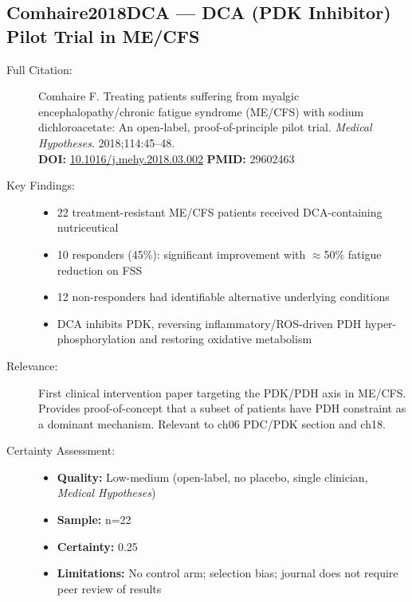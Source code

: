 \subsection*{Comhaire2018DCA --- DCA (PDK Inhibitor) Pilot Trial in ME/CFS}
\begin{description}
    \item[Full Citation:] Comhaire F. Treating patients suffering from myalgic encephalopathy/chronic fatigue syndrome (ME/CFS) with sodium dichloroacetate: An open-label, proof-of-principle pilot trial. \textit{Medical Hypotheses}. 2018;114:45--48.\\
    \textbf{DOI:} \href{https://doi.org/10.1016/j.mehy.2018.03.002}{10.1016/j.mehy.2018.03.002} \quad \textbf{PMID:} 29602463
    \item[Key Findings:]
    \begin{itemize}
        \item 22 treatment-resistant ME/CFS patients received DCA-containing nutriceutical
        \item 10 responders (45\%): significant improvement with $\approx$50\% fatigue reduction on FSS
        \item 12 non-responders had identifiable alternative underlying conditions
        \item DCA inhibits PDK, reversing inflammatory/ROS-driven PDH hyper-phosphorylation and restoring oxidative metabolism
    \end{itemize}
    \item[Relevance:] First clinical intervention paper targeting the PDK/PDH axis in ME/CFS. Provides proof-of-concept that a subset of patients have PDH constraint as a dominant mechanism. Relevant to ch06 PDC/PDK section and ch18.
    \item[Certainty Assessment:]
    \begin{itemize}
        \item \textbf{Quality:} Low-medium (open-label, no placebo, single clinician, \textit{Medical Hypotheses})
        \item \textbf{Sample:} n=22
        \item \textbf{Certainty:} 0.25
        \item \textbf{Limitations:} No control arm; selection bias; journal does not require peer review of results
    \end{itemize}
\end{description}

